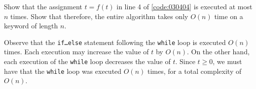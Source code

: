 \begin{exercise}\label{ex:030405}
    Show that the assignment $t = f(t)$ in line 4 of \cref{code:030404} is
    executed at most $n$ times. Show that therefore, the entire algorithm takes
    only $O(n)$ time on a keyword of length $n$.
\end{exercise}
\begin{solution}\label{sol:030405}
    Observe that the \texttt{if\dots{}else} statement following the
    \texttt{while} loop is executed $O(n)$ times. Each execution may increase
    the value of $t$ by $O(n)$. On the other hand, each execution of the
    \texttt{while} loop decreases the value of $t$. Since $t \ge 0$, we must
    have that the \texttt{while} loop was executed $O(n)$ times, for a total
    complexity of $O(n)$.
\end{solution}